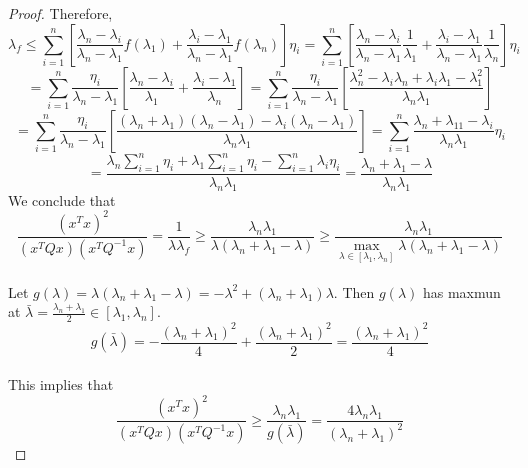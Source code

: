 \documentclass[11pt,a4paper]{article}
\renewcommand{\(}{\left(}
\renewcommand{\)}{\right)}
\begin{document}
\begin{proof}
  	
  	Therefore, $$\displaystyle \lambda_f \leq \sum_{i=1}^n \left[ \frac{\lambda_n-\lambda_i}{\lambda_n-\lambda_1}f(\lambda_1)+\frac{\lambda_i-\lambda_1}{\lambda_n-\lambda_1}f(\lambda_n) \right] \eta_i = \sum_{i=1}^n \left[ \frac{\lambda_n-\lambda_i}{\lambda_n-\lambda_1} \frac{1}{\lambda_1} + \frac{\lambda_i-\lambda_1}{\lambda_n-\lambda_1}\frac{1}{\lambda_n} \right] \eta_i $$
  	$$\displaystyle = \sum_{i=1}^n \frac{\eta_i}{\lambda_n - \lambda_1} \left[ \frac{\lambda_n-\lambda_i}{\lambda_1}+\frac{\lambda_i-\lambda_1}{\lambda_n} \right] = \sum_{i=1}^n \frac{\eta_i}{\lambda_n - \lambda_1} \left[ \frac{\lambda_n^2-\lambda_i \lambda_n + \lambda_i \lambda_1 - \lambda_1^2}{\lambda_n \lambda_1} \right]$$
  	$$\displaystyle =\sum_{i=1}^n \frac{\eta_i}{\lambda_n - \lambda_1} \left[ \frac{(\lambda_n+\lambda_1)(\lambda_n-\lambda_1)-\lambda_i (\lambda_n-\lambda_1)}{\lambda_n \lambda_1} \right] = \sum_{i=1}^n \frac{\lambda_n+\lambda_11-\lambda_i}{\lambda_n \lambda_1} \eta_i $$
  	$$\displaystyle = \frac{\lambda_n \sum_{i=1}^n \eta_i + \lambda_1 \sum_{i=1}^n \eta_i - \sum_{i=1}^n \lambda_i \eta_i}{\lambda_n \lambda_1} = \frac{\lambda_n + \lambda_1 - \lambda}{\lambda_n \lambda_1}$$
  	We conclude that $$\displaystyle \frac{(x^Tx)^2}{(x^TQx)(x^TQ^{-1}x)} = \frac{1}{\lambda \lambda_f} \geq \frac{\lambda_n \lambda_1}{\lambda(\lambda_n + \lambda_1 - \lambda)} \geq \frac{\lambda_n \lambda_1}{\max_{\lambda \in [\lambda_1,\lambda_n]} \lambda(\lambda_n + \lambda_1 - \lambda)}$$\\
  	Let $g(\lambda) = \lambda(\lambda_n + \lambda_1 - \lambda) = -\lambda^2+(\lambda_n+\lambda_1)\lambda$. Then $g(\lambda)$ has maxmun at $\displaystyle \bar{\lambda}=\frac{\lambda_n+\lambda_1}{2} \in [\lambda_1,\lambda_n]$.\\
  	$$\displaystyle g(\bar{\lambda})=-\frac{(\lambda_n+\lambda_1)^2}{4}+\frac{(\lambda_n+\lambda_1)^2}{2}=\frac{(\lambda_n+\lambda_1)^2}{4}$$\\
  	This implies that $$\displaystyle \frac{(x^Tx)^2}{(x^TQx)(x^TQ^{-1}x)} \geq \frac{\lambda_n \lambda_1}{g(\bar{\lambda})} = \frac{4\lambda_n \lambda_1}{(\lambda_n+\lambda_1)^2}$$
  	
  	
  \end{proof}
\end{document}

